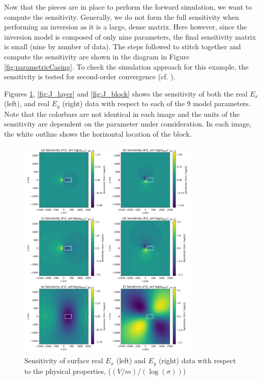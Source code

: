 Now that the pieces are in place to perform the forward simulation, we want to
compute the sensitivity. Generally, we do not form the full sensitivity when
performing an inversion as it is a large, dense matrix. Here however, since
the inversion model is composed of only nine parameters, the final sensitivity
matrix is small (nine by number of data). The steps followed to stitch together
and compute the sensitivity are shown in the diagram in Figure
\ref{fig:parametricCasing}. To check the simulation approach for this example,
the sensitivity is tested for second-order convergence (cf.
\cite{Haber2014a}).

Figures \ref{fig:J_sigmas}, \ref{fig:J_layer} and \ref{fig:J_block} shows the
sensitivity of both the real $E_x $(left), and real $E_y$ (right) data with
respect to each of the 9 model parameters. Note that the colorbars are not
identical in each image and the units of the sensitivity are dependent on the
parameter under consideration. In each image, the white outline shows the
horizontal location of the block.

{%
\begin{figure}[htb!]
    \centering
    \includegraphics[width=0.77\textwidth]{images/J_sigmas.png}
\caption{Sensitivity of surface real $E_x$ (left) and $E_y$ (right) data with respect to the physical properties, ($(V / m) / (\log(\sigma))$)}
\label{fig:J_sigmas}
\end{figure}
}

